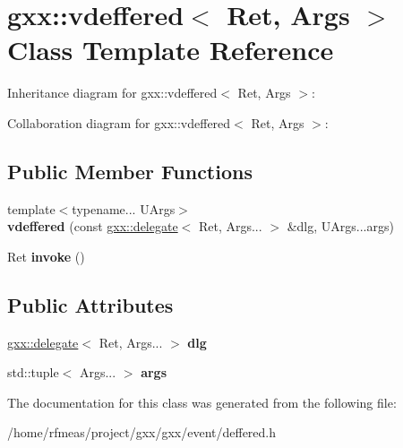 \hypertarget{classgxx_1_1vdeffered}{}\section{gxx\+:\+:vdeffered$<$ Ret, Args $>$ Class Template Reference}
\label{classgxx_1_1vdeffered}


Inheritance diagram for gxx\+:\+:vdeffered$<$ Ret, Args $>$\+:


Collaboration diagram for gxx\+:\+:vdeffered$<$ Ret, Args $>$\+:
\subsection*{Public Member Functions}
\begin{DoxyCompactItemize}
\item 
{\footnotesize template$<$typename... U\+Args$>$ }\\{\bfseries vdeffered} (const \hyperlink{classgxx_1_1delegate}{gxx\+::delegate}$<$ Ret, Args... $>$ \&dlg, U\+Args...\+args)\hypertarget{classgxx_1_1vdeffered_acc3ad2ae240c9c14f87602655f31ab18}{}\label{classgxx_1_1vdeffered_acc3ad2ae240c9c14f87602655f31ab18}

\item 
Ret {\bfseries invoke} ()\hypertarget{classgxx_1_1vdeffered_afcd10263127a24619953aa81f9dc3a45}{}\label{classgxx_1_1vdeffered_afcd10263127a24619953aa81f9dc3a45}

\end{DoxyCompactItemize}
\subsection*{Public Attributes}
\begin{DoxyCompactItemize}
\item 
\hyperlink{classgxx_1_1delegate}{gxx\+::delegate}$<$ Ret, Args... $>$ {\bfseries dlg}\hypertarget{classgxx_1_1vdeffered_a7328d90c531b14c15ce7be331c330f9b}{}\label{classgxx_1_1vdeffered_a7328d90c531b14c15ce7be331c330f9b}

\item 
std\+::tuple$<$ Args... $>$ {\bfseries args}\hypertarget{classgxx_1_1vdeffered_abc855676ebf23fcc767e1e16c3c5bbab}{}\label{classgxx_1_1vdeffered_abc855676ebf23fcc767e1e16c3c5bbab}

\end{DoxyCompactItemize}


The documentation for this class was generated from the following file\+:\begin{DoxyCompactItemize}
\item 
/home/rfmeas/project/gxx/gxx/event/deffered.\+h\end{DoxyCompactItemize}
